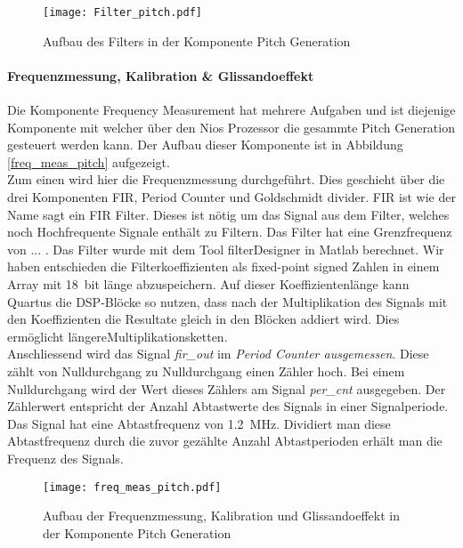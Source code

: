 \begin{figure}[h!]
	\centering
	\texttt{[image: Filter\_pitch.pdf]}
	\caption{Aufbau des Filters in der Komponente Pitch Generation} 
	\label{img:Filter_Pitch}
\end{figure}  

\paragraph{Frequenzmessung, Kalibration \& Glissandoeffekt}

Die Komponente Frequency Measurement hat mehrere Aufgaben und ist diejenige Komponente mit welcher über den Nios Prozessor die gesammte Pitch Generation gesteuert werden kann. Der Aufbau dieser Komponente ist in Abbildung \ref{freq_meas_pitch} aufgezeigt.\\
Zum einen wird hier die Frequenzmessung durchgeführt. Dies geschieht über die drei Komponenten FIR, Period Counter und Goldschmidt divider. FIR ist wie der Name sagt ein FIR Filter. Dieses ist nötig um das Signal aus dem Filter, welches noch Hochfrequente Signale enthält zu Filtern. Das Filter hat eine Grenzfrequenz von ... . Das Filter wurde mit dem Tool filterDesigner in Matlab berechnet. Wir haben entschieden die Filterkoeffizienten als fixed-point signed Zahlen in einem Array mit \SI{18}{bit} länge abzuspeichern. Auf dieser Koeffizientenlänge kann Quartus die DSP-Blöcke so nutzen, dass nach der Multiplikation des Signals mit den Koeffizienten die Resultate gleich in den Blöcken addiert wird. Dies ermöglicht längereMultiplikationsketten.  \\
Anschliessend wird das Signal \textit{fir_out} im \textit{Period Counter ausgemessen}. Diese zählt von Nulldurchgang zu Nulldurchgang einen Zähler hoch. Bei einem Nulldurchgang wird der Wert dieses Zählers am Signal \textit{per_cnt} ausgegeben. Der Zählerwert entspricht der Anzahl Abtastwerte des Signals in einer Signalperiode. \\
Das Signal hat eine Abtastfrequenz von \SI{1.2}{MHz}. Dividiert man diese Abtastfrequenz durch die zuvor gezählte Anzahl Abtastperioden erhält man die Frequenz des Signals.

\begin{figure}[h!]
	\centering
	\texttt{[image: freq\_meas\_pitch.pdf]}
	\caption{Aufbau der Frequenzmessung, Kalibration und Glissandoeffekt in der Komponente Pitch Generation} 
	\label{img:freq_meas_pitch}
\end{figure}  
